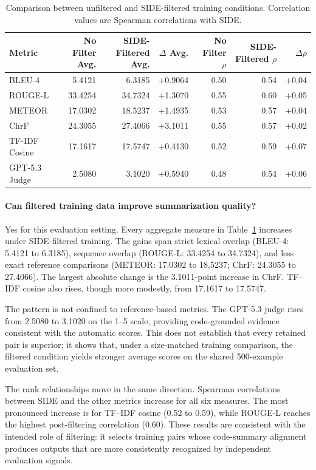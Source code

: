 \begin{table}[t]
\centering
\caption{Comparison between unfiltered and SIDE-filtered training conditions. Correlation values are Spearman correlations with SIDE.}
\label{tab:extension_metrics}
\begin{tabular}{lrrrrrr}
\hline
\textbf{Metric} &
\textbf{No Filter Avg.} &
\textbf{SIDE-Filtered Avg.} &
\textbf{$\Delta$ Avg.} &
\textbf{No Filter $\rho$} &
\textbf{SIDE-Filtered $\rho$} &
\textbf{$\Delta \rho$} \\
\hline
BLEU-4 & 5.4121 & 6.3185 & +0.9064 & 0.50 & 0.54 & +0.04 \\
ROUGE-L & 33.4254 & 34.7324 & +1.3070 & 0.55 & 0.60 & +0.05 \\
METEOR & 17.0302 & 18.5237 & +1.4935 & 0.53 & 0.57 & +0.04 \\
ChrF & 24.3055 & 27.4066 & +3.1011 & 0.55 & 0.57 & +0.02 \\
TF-IDF Cosine & 17.1617 & 17.5747 & +0.4130 & 0.52 & 0.59 & +0.07 \\
GPT-5.3 Judge & 2.5080 & 3.1020 & +0.5940 & 0.48 & 0.54 & +0.06 \\
\hline
\end{tabular}
\end{table}

\paragraph{\textbf{Can filtered training data improve summarization quality?}} Yes for this evaluation setting. Every aggregate measure in Table~\ref{tab:extension_metrics} increases under SIDE-filtered training. The gains span strict lexical overlap (BLEU-4: 5.4121 to 6.3185), sequence overlap (ROUGE-L: 33.4254 to 34.7324), and less exact reference comparisons (METEOR: 17.0302 to 18.5237; ChrF: 24.3055 to 27.4066). The largest absolute change is the 3.1011-point increase in ChrF. TF--IDF cosine also rises, though more modestly, from 17.1617 to 17.5747.

The pattern is not confined to reference-based metrics. The GPT-5.3 judge rises from 2.5080 to 3.1020 on the 1--5 scale, providing code-grounded evidence consistent with the automatic scores. This does not establish that every retained pair is superior; it shows that, under a size-matched training comparison, the filtered condition yields stronger average scores on the shared 500-example evaluation set.

The rank relationships move in the same direction. Spearman correlations between SIDE and the other metrics increase for all six measures. The most pronounced increase is for TF--IDF cosine (0.52 to 0.59), while ROUGE-L reaches the highest post-filtering correlation (0.60). These results are consistent with the intended role of filtering: it selects training pairs whose code-summary alignment produces outputs that are more consistently recognized by independent evaluation signals.


